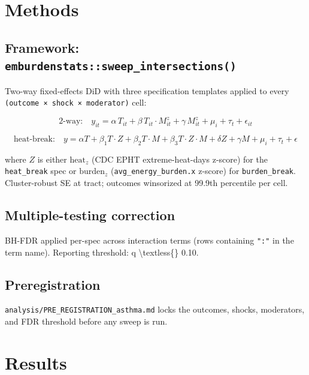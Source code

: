 \documentclass[
]{article}
\begin{document}
\hypertarget{methods}{%
\section{Methods}\label{methods}}

\hypertarget{framework-emburdenstatssweep_intersections}{%
\subsection{\texorpdfstring{Framework:
\texttt{emburdenstats::sweep\_intersections()}}{Framework: emburdenstats::sweep\_intersections()}}\label{framework-emburdenstatssweep_intersections}}

Two-way fixed-effects DiD with three specification templates applied to
every \texttt{(outcome\ ×\ shock\ ×\ moderator)} cell:

\[
\text{2-way:} \quad y_{it} = \alpha \, T_{it} + \beta \, T_{it} \cdot M^z_{it} + \gamma \, M^z_{it} + \mu_i + \tau_t + \epsilon_{it}
\]

\[
\text{heat-break:} \quad y = \alpha T + \beta_1 T \cdot Z + \beta_2 T \cdot M + \beta_3 T \cdot Z \cdot M + \delta Z + \gamma M + \mu_i + \tau_t + \epsilon
\]

where \(Z\) is either \(\text{heat}_z\) (CDC EPHT extreme-heat-days
z-score) for the \texttt{heat\_break} spec or \(\text{burden}_z\)
(\texttt{avg\_energy\_burden.x} z-score) for \texttt{burden\_break}.
Cluster-robust SE at tract; outcomes winsorized at 99.9th percentile per
cell.

\hypertarget{multiple-testing-correction}{%
\subsection{Multiple-testing
correction}\label{multiple-testing-correction}}

BH-FDR applied per-spec across interaction terms (rows containing
\texttt{":"} in the term name). Reporting threshold: q
\textbackslash textless\{\} 0.10.

\hypertarget{preregistration}{%
\subsection{Preregistration}\label{preregistration}}

\texttt{analysis/PRE\_REGISTRATION\_asthma.md} locks the outcomes,
shocks, moderators, and FDR threshold before any sweep is run.

\hypertarget{results}{%
\section{Results}\label{results}}
\end{document}
